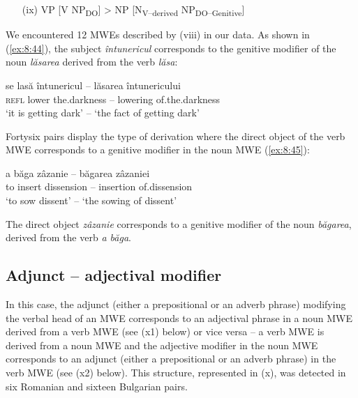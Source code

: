 \documentclass[output=paper]{langsci/langscibook}
\begin{document}
\renewcommand{\theenumi}{(\roman{enumi})}%
\begin{enumerate}
 \setcounter{enumi}{8}
\item[(ix)] VP [V NP\textsubscript{DO}] > NP [N\textsubscript{V–derived}
NP\textsubscript{DO–Genitive}]
\end{enumerate}


We encountered 12 MWEs described by (viii) in our data. As shown in
(\ref{ex:8:44}), the subject \textit{întunericul} corresponds to the genitive modifier of
the noun \textit{lăsarea} derived from the verb \textit{lăsa}: 


\begin{exe}
\ex \label{ex:8:44}
\settowidth{}
\gll se lasă întunericul -- lăsarea întunericului\\ 
\textsc{refl} lower {the.darkness} -- {lowering} {of.the.darkness} \\
\glt ‘it is getting dark’ -- ‘the fact of getting dark’
\end{exe}


Forty\textendash six pairs display the type of derivation where the direct object of the
verb MWE corresponds to a genitive modifier in the noun MWE (\ref{ex:8:45}): 


\begin{exe}
\ex \label{ex:8:45}
\settowidth{}
\gll a băga zâzanie -- băgarea zâzaniei \\
to insert dissension -- insertion {of.dissension} \\
\glt ‘to sow dissent’ -- ‘the sowing of dissent’
\end{exe}


The direct object \textit{zâzanie} corresponds to a genitive modifier of the
noun \textit{băgarea}, derived from the verb \textit{a băga}.



\subsection{Adjunct -- adjectival modifier}
\label{section64}


In this case, the adjunct (either a prepositional or an adverb phrase)
modifying the verbal head of an MWE corresponds to an adjectival phrase
in a noun MWE derived from a verb MWE (see (x1) below) or vice versa --
a verb MWE is derived from a noun MWE and the adjective modifier in the
noun MWE corresponds to an adjunct (either a prepositional or an adverb
phrase) in the verb MWE (see (x2) below). This structure, represented
in (x), was detected in six Romanian and sixteen Bulgarian pairs. 
\end{document}
